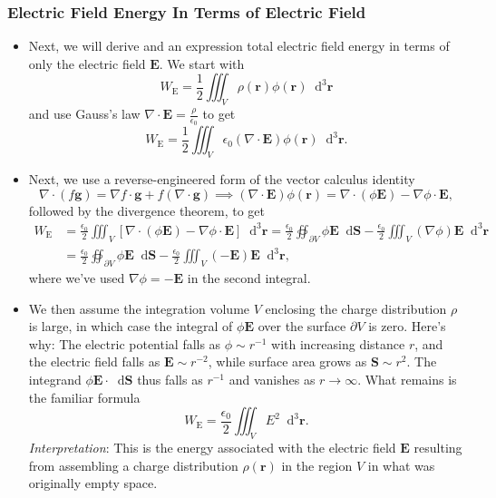 \documentclass[11pt, a4paper]{article}
\newcommand{\diff}{\mathop{}\!\mathrm{d}} %
\newcommand{\dr}{\diff^{3} \r}  %
\renewcommand{\vec}[1]{\bm{#1}} %
\renewcommand{\r}{\vec{r}}
\newcommand{\E}{\vec{E}} %
\newcommand{\ee}{\epsilon_{0}}  %
\renewcommand{\div}{\nabla \cdot}
\renewcommand{\grad}{\nabla}
\begin{document}
\subsubsection{Electric Field Energy In Terms of Electric Field}
\begin{itemize}
	\item Next, we will derive and an expression total electric field energy in terms of only the electric field $ \E $. We start with
	\begin{equation*}
		W_{\text{E}} = \frac{1}{2} \iiint_{V} \rho(\r) \phi(\r) \dr
	\end{equation*}
	and use Gauss's law $ \div \E = \frac{\rho}{\ee} $ to get
	\begin{equation*}
		W_{\text{E}}  = \frac{1}{2} \iiint_{V} \ee (\div \E) \phi(\r) \dr.
	\end{equation*}
	
    \item Next, we use a reverse-engineered form of the vector calculus identity 
	\begin{equation*}
		\div (f \vec{g}) = \grad f \cdot \vec{g} + f (\div \vec{g}) \implies (\div \E) \phi(\r) = \div (\phi \E) - \grad \phi \cdot \E,
	\end{equation*}
	followed by the divergence theorem, to get
	\begin{align*}
		W_{\text{E}} &= \frac{\ee}{2} \iiint_{V}\left[\div (\phi \E) - \grad \phi \cdot \E\right] \dr = \frac{\ee}{2} \oiint_{\partial V} \phi \E \diff \vec{S} - \frac{\ee}{2} \iiint_{V} (\grad \phi) \E \dr\\
		& =  \frac{\ee}{2} \oiint_{\partial V} \phi \E \diff \vec{S} - \frac{\ee}{2} \iiint_{V} (- \E) \E \dr,
	\end{align*}
	where we've used $ \grad \phi = - \E $ in the second integral. 
	
	\item We then assume the integration volume $ V $ enclosing the charge distribution $ \rho $ is large, in which case the integral of $ \phi \E $ over the surface $ \partial V $ is zero. Here's why: The electric potential falls as $ \phi \sim r^{-1} $ with increasing distance $ r $, and the electric field falls as $ \E \sim r^{-2} $, while surface area grows as $ \vec{S} \sim r^{2} $. The integrand  $ \phi \E \cdot \diff \vec{S} $ thus falls as $ r^{-1} $ and vanishes as $ r \to \infty $. What remains is the familiar formula
	\begin{equation*}
		W_{\text{E}} = \frac{\ee}{2} \iiint_{V} E^{2} \dr.
	\end{equation*} 
	\textit{Interpretation}: This is the energy associated with the electric field $ \E $ resulting from assembling a charge distribution $ \rho(\r) $ in the region $ V $ in what was originally empty space.

\end{itemize}
\end{document}
